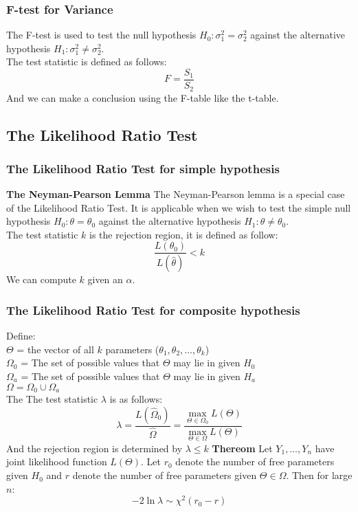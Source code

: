 \documentclass[sn-mathphys,Numbered]{sn-jnl}%
\newcommand{\Theorem}{\textbf{Thereom }}
\begin{document}
\subsubsection{F-test for Variance}\label{f-test}
The F-test is used to test the null hypothesis $H_0: \sigma_1^2 = \sigma_2^2$
against the alternative hypothesis $H_1: \sigma_1^2 \neq \sigma_2^2$.\\ The
test statistic is defined as follows:
\begin{equation}
    F = \frac{S_1}{S_2}
\end{equation}
And we can make a conclusion using the F-table like the t-table.

\subsection{The Likelihood Ratio Test}\label{likelihood-ratio}
\subsubsection{The Likelihood Ratio Test for simple hypothesis}\label{likelihood-ratio-simple}
\textbf{The Neyman-Pearson Lemma}
The Neyman-Pearson lemma is a special case of the Likelihood Ratio Test. It is applicable when we wish to test the simple null hypothesis $H_0: \theta = \theta_0$ against the alternative hypothesis $H_1: \theta \neq \theta_0$.\\
The test statistic $k$ is the rejection region, it is defined as follow:
\begin{equation}
    \frac{L(\theta_0)}{L(\hat \theta)} < k
\end{equation}
We can compute $k$ given an $\alpha$.
\subsubsection{The Likelihood Ratio Test for composite hypothesis}\label{likelihood-ratio-composite}
Define: \\ $\Theta$ = the vector of all $k$ parameters ($\theta_1, \theta_2,
    \dots, \theta_k$)\\ $\Omega_0$ = The set of possible values that $\Theta$ may
lie in given $H_0$ \\ $\Omega_a$ = The set of possible values that $\Theta$ may
lie in given $H_a$ \\ $\Omega = \Omega_0 \cup \Omega_a$ \\The The test
statistic $\lambda$ is as follows:
\begin{equation}
    \lambda = \frac{L(\hat \Omega_0)}{\hat \Omega} = \frac{\max_{\Theta \in \Omega_0}L(\Theta)}{\max_{\Theta \in \Omega} L(\Theta)}
\end{equation}
And the rejection region is determined by $\lambda \le k$
\Theorem Let $Y_1, \dots, Y_n$ have joint likelihood function $L(\Theta)$. Let $r_0$ denote the number of free parameters given $H_0$ and $r$ denote the number of free parameters given $\Theta \in \Omega$. Then for large $n$:
\begin{equation}
    -2 \ln \lambda \sim \chi^2(r_0-r)
\end{equation}
\end{document}
